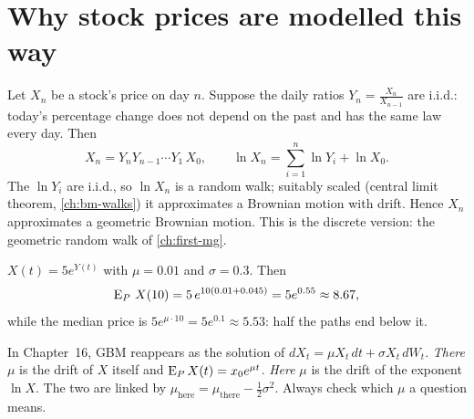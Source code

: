 \begin{pic}
\end{pic}

\section{Why stock prices are modelled this way}

Let $X_n$ be a stock's price on day $n$. Suppose the daily ratios $Y_n=\frac{X_n}{X_{n-1}}$ are i.i.d.: today's percentage change does not depend on the past and has the same law every day. Then
\[
  X_n=Y_nY_{n-1}\cdots Y_1\,X_0,\qquad \ln X_n=\sum_{i=1}^n\ln Y_i+\ln X_0 .
\]
The $\ln Y_i$ are i.i.d., so $\ln X_n$ is a random walk; suitably scaled (central limit theorem, \cref{ch:bm-walks}) it approximates a Brownian motion with drift. Hence $X_n$ approximates a geometric Brownian motion. This is the discrete version: the geometric random walk of \cref{ch:first-mg}.

\begin{example}
\label{ex:gbm-price}
$X(t)=5e^{Y(t)}$ with $\mu=0.01$ and $\sigma=0.3$. Then
\[
  \operatorname{E}_P\,X(10)=5\,e^{10(0.01+0.045)}=5e^{0.55}\approx8.67,
\]
while the median price is $5e^{\mu\cdot10}=5e^{0.1}\approx5.53$: half the paths end below it.
\end{example}

\begin{remark}
\label{rem:two-mu}
In Chapter~16, GBM reappears as the solution of $dX_t=\mu X_t\,dt+\sigma X_t\,dW_t$. \emph{There} $\mu$ is the drift of $X$ itself and $\operatorname{E}_PX(t)=x_0e^{\mu t}$. \emph{Here} $\mu$ is the drift of the exponent $\ln X$. The two are linked by $\mu_{\text{here}}=\mu_{\text{there}}-\frac12\sigma^2$. Always check which $\mu$ a question means.
\end{remark}

